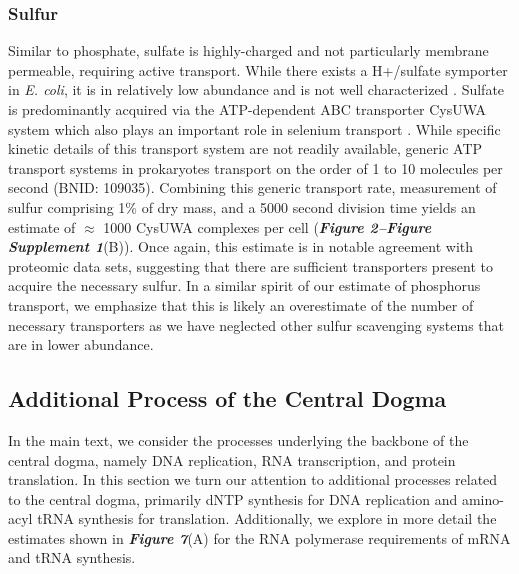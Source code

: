 \subsubsection{Sulfur}
Similar to phosphate, sulfate is highly-charged and not particularly membrane
permeable, requiring active transport. While there exists a H+/sulfate
symporter in \textit{E. coli}, it is in relatively low abundance and is not
well characterized \citep{zhang2014}. Sulfate is predominantly acquired via
the ATP-dependent ABC transporter CysUWA system which also plays an important
role in selenium transport \citep{sekowska2000, sirko1995}. While specific
kinetic details of this transport system are not readily available, generic
ATP transport systems in prokaryotes transport on the order of 1 to 10
molecules per second (BNID: 109035). Combining this generic transport rate,
measurement of sulfur comprising 1\% of dry mass, and a 5000 second division
time yields an estimate of $\approx$ 1000 CysUWA complexes per cell
(\textbf{\textit{Figure 2–Figure Supplement 1}}(B)). Once again, this estimate is in notable
agreement with proteomic data sets, suggesting that there are sufficient
transporters present to acquire the necessary sulfur. In a similar spirit of
our estimate of phosphorus transport, we emphasize that this is likely an
overestimate of the number of necessary transporters as we have neglected
other sulfur scavenging systems that are in lower abundance.



\subsection{Additional Process of the Central Dogma}
\label{sec:SI_central_dogma}
In the main text, we consider the processes underlying the backbone of the
central dogma, namely DNA replication, RNA transcription, and protein
translation. In this section we turn our attention to additional processes
related to the central dogma, primarily dNTP synthesis for DNA replication and
amino-acyl tRNA synthesis for translation. Additionally, we explore in more
detail the estimates shown in \textbf{\textit{Figure 7}}(A) for the RNA polymerase
requirements of mRNA and tRNA synthesis.

